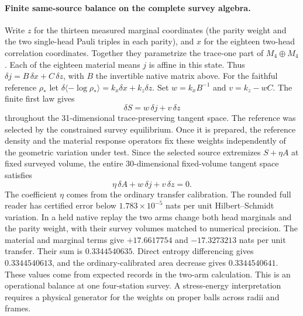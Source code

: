 \documentclass[11pt]{article}
\begin{document}
\paragraph{Finite same-source balance on the complete survey algebra.}
Write $z$ for the thirteen measured marginal coordinates (the parity
weight and the two single-head Pauli triples in each parity), and $x$
for the eighteen two-head correlation coordinates. Together they
parametrize the trace-one part of $M_4\oplus M_4$. Each of the eighteen
material means $j$ is affine in this state. Thus
$\delta j=B\,\delta x+C\,\delta z$, with $B$ the invertible native
matrix above. For the faithful reference $\rho_*$ let
$\delta\langle-\log\rho_*\rangle=k_x\delta x+k_z\delta z$.
Set $w=k_xB^{-1}$ and $v=k_z-w C$. The finite first law gives
\[
    \delta S=w\,\delta j+v\,\delta z
\]
throughout the 31-dimensional trace-preserving tangent space. The reference was
selected by the constrained survey equilibrium. Once it is prepared,
the reference density and the material response operators fix these
weights independently of the geometric variation under test. Since
the selected source extremizes $S+\eta A$ at fixed surveyed volume,
the entire 30-dimensional fixed-volume tangent space satisfies
\[
     \eta\,\delta A+w\,\delta j+v\,\delta z=0 .
\]
The coefficient $\eta$ comes from the ordinary transfer calibration.
The rounded full reader has certified error below $1.783\times10^{-5}$
nats per unit Hilbert--Schmidt variation. In a held native replay the
two arms change both head marginals and the parity weight, with their
survey volumes matched to numerical precision. The material and
marginal terms give $+17.6617754$ and $-17.3273213$ nats per unit
transfer. Their sum is $0.3344540635$. Direct entropy differencing
gives $0.3344540613$, and the ordinary-calibrated area decrease gives
$0.3344540641$. These values come from expected records in the
two-arm calculation.
This is an operational balance at one four-station survey. A
stress-energy interpretation requires a physical generator for the
weights on proper balls across radii and frames.
\end{document}
